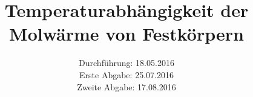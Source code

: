 

\subject{Versuch 47}
\title{Temperaturabhängigkeit der Molwärme von Festkörpern}
\date{Durchführung: 18.05.2016 \\
      Erste Abgabe: 25.07.2016 \\
      Zweite Abgabe: 17.08.2016}



\maketitle
\newpage







\printbibliography


